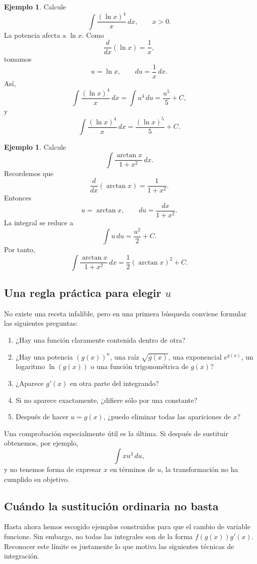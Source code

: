\documentclass[12pt]{article}
\theoremstyle{definition}
\newtheorem{ejemplo}[teorema]{Ejemplo}
\theoremstyle{remark}
\begin{document}
\begin{ejemplo}
Calcule
\[
\int\frac{(\ln x)^4}{x}\,dx,\qquad x>0.
\]
La potencia afecta a $\ln x$. Como
\[
\frac{d}{dx}(\ln x)=\frac1x,
\]
tomamos
\[
u=\ln x,\qquad du=\frac1x\,dx.
\]
Así,
\[
\int\frac{(\ln x)^4}{x}\,dx
=\int u^4\,du
=\frac{u^5}{5}+C,
\]
y
\[
\boxed{\int\frac{(\ln x)^4}{x}\,dx=\frac{(\ln x)^5}{5}+C.}
\]
\end{ejemplo}

\begin{ejemplo}
Calcule
\[
\int\frac{\arctan x}{1+x^2}\,dx.
\]
Recordemos que
\[
\frac{d}{dx}(\arctan x)=\frac1{1+x^2}.
\]
Entonces
\[
u=\arctan x,\qquad du=\frac{dx}{1+x^2}.
\]
La integral se reduce a
\[
\int u\,du=\frac{u^2}{2}+C.
\]
Por tanto,
\[
\boxed{\int\frac{\arctan x}{1+x^2}\,dx=\frac12(\arctan x)^2+C.}
\]
\end{ejemplo}

\subsection*{Una regla práctica para elegir $u$}

No existe una receta infalible, pero en una primera búsqueda conviene formular las siguientes preguntas:
\begin{enumerate}
\item ¿Hay una función claramente contenida dentro de otra?
\item ¿Hay una potencia $(g(x))^n$, una raíz $\sqrt{g(x)}$, una exponencial $e^{g(x)}$, un logaritmo $\ln(g(x))$ o una función trigonométrica de $g(x)$?
\item ¿Aparece $g'(x)$ en otra parte del integrando?
\item Si no aparece exactamente, ¿difiere sólo por una constante?
\item Después de hacer $u=g(x)$, ¿puedo eliminar todas las apariciones de $x$?
\end{enumerate}

Una comprobación especialmente útil es la última. Si después de sustituir obtenemos, por ejemplo,
\[
\int xu^3\,du,
\]
y no tenemos forma de expresar $x$ en términos de $u$, la transformación no ha cumplido su objetivo.

\subsection*{Cuándo la sustitución ordinaria no basta}

Hasta ahora hemos escogido ejemplos construidos para que el cambio de variable funcione. Sin embargo, no todas las integrales son de la forma $f(g(x))g'(x)$. Reconocer este límite es justamente lo que motiva las siguientes técnicas de integración.
\end{document}
